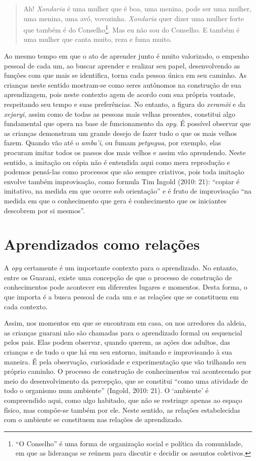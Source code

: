 \begin{quotation}
Ah! \emph{Xondaria} é uma mulher que é boa, uma menina, pode ser uma mulher,
uma menina, uma avó, vovozinha. \emph{Xondaria} quer dizer uma mulher forte
que também é do Conselho\footnote{``O Conselho'' é uma forma de
organização social e política da comunidade, em que as lideranças se
reúnem para discutir e decidir os assuntos coletivos. }. Mas eu não sou
do Conselho. E também é uma mulher que canta muito, reza e fuma muito.
\end{quotation}

Ao mesmo tempo em que o ato de aprender junto é muito valorizado, o
empenho pessoal de cada um, ao buscar aprender e realizar seu papel,
desenvolvendo as funções com que mais se identifica, torna cada pessoa
única em seu caminho. As crianças neste sentido mostram-se como seres
autônomos na construção de sua aprendizagem, pois neste contexto agem
de acordo com sua própria vontade, respeitando seu tempo e suas
preferências.  No entanto, a figura do \emph{xeramõi} e da \emph{xejaryi}, assim como
de todas as pessoas mais velhas presentes, constitui algo fundamental
que opera na base de funcionamento da \emph{opy}. É possível observar que as
crianças demonstram um grande desejo de fazer tudo o que os mais velhos
fazem. Quando vão até o \emph{amba’i}, ou fumam \emph{petyngua}, por exemplo, elas
procuram imitar todos os passos dos mais velhos e assim vão aprendendo.
Neste sentido, a imitação ou cópia não é entendida aqui como mera
reprodução e podemos pensá-las como processos que são sempre criativos,
pois toda imitação envolve também improvisação, como formula Tim Ingold
(2010: 21): ``copiar é imitativo, na medida em que ocorre sob
orientação'' e é fruto de improvisação ``na medida em que o conhecimento
que gera é conhecimento que os iniciantes descobrem por si mesmos''.

\section{Aprendizados como relações}

A \emph{opy} certamente é um importante contexto para o aprendizado. No
entanto, entre os Guarani, existe uma concepção de que o processo de
construção de conhecimentos pode acontecer em diferentes lugares e
momentos. Desta forma, o que importa é a busca pessoal de cada um e as
relações que se constituem em cada contexto. 

Assim, nos momentos em que se encontram em casa, ou nos arredores da
aldeia, as crianças guarani não são chamadas para o aprendizado formal
ou sequencial pelos pais. Elas podem observar, quando querem, as ações
dos adultos, das crianças e de tudo o que há em seu entorno, imitando e
improvisando à sua maneira. É pela observação, curiosidade e
experimentação que vão trilhando seu próprio caminho. O processo de
construção de conhecimentos vai acontecendo por meio do desenvolvimento
da percepção, que se constitui ``como uma atividade de todo o organismo
num ambiente'' (Ingold, 2010: 21). O ‘ambiente’ é compreendido aqui,
como algo habitado, que não se restringe apenas ao espaço físico, mas
compõe-se também por ele. Neste sentido, as relações estabelecidas com o
ambiente se constituem nas relações de aprendizado.

